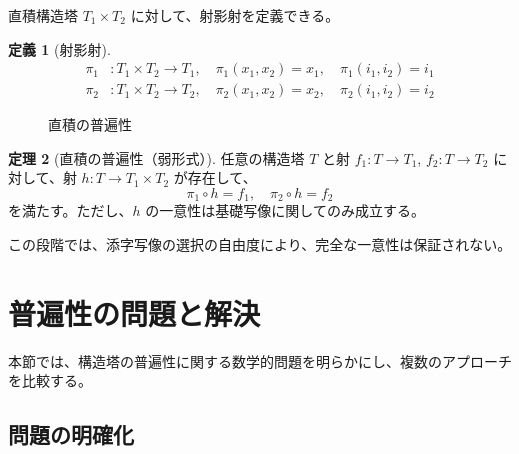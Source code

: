 \documentclass[a4paper,12pt]{ltjsarticle}
\theoremstyle{definition}
\newtheorem{definition}{定義}[section]
\newtheorem{theorem}[definition]{定理}
\begin{document}
直積構造塔 $T_1 \times T_2$ に対して、射影射を定義できる。

\begin{definition}[射影射]
\label{def:projections}
\begin{align*}
\pi_1 &: T_1 \times T_2 \to T_1, \quad \pi_1(x_1, x_2) = x_1, \quad \pi_1(i_1, i_2) = i_1 \\
\pi_2 &: T_1 \times T_2 \to T_2, \quad \pi_2(x_1, x_2) = x_2, \quad \pi_2(i_1, i_2) = i_2
\end{align*}
\end{definition}

\begin{figure}[h]
\centering
{}
\caption{直積の普遍性}
\label{fig:product-universality}
\end{figure}

\begin{theorem}[直積の普遍性（弱形式）]
\label{thm:product-universality-weak}
任意の構造塔 $T$ と射 $f_1: T \to T_1$, $f_2: T \to T_2$ に対して、射 $h: T \to T_1 \times T_2$ が存在して、
\[
\pi_1 \circ h = f_1, \quad \pi_2 \circ h = f_2
\]
を満たす。ただし、$h$ の一意性は基礎写像に関してのみ成立する。
\end{theorem}

この段階では、添字写像の選択の自由度により、完全な一意性は保証されない。

\section{普遍性の問題と解決}
\label{sec:cat2-revised}

本節では、構造塔の普遍性に関する数学的問題を明らかにし、複数のアプローチを比較する。

\subsection{問題の明確化}
\end{document}
